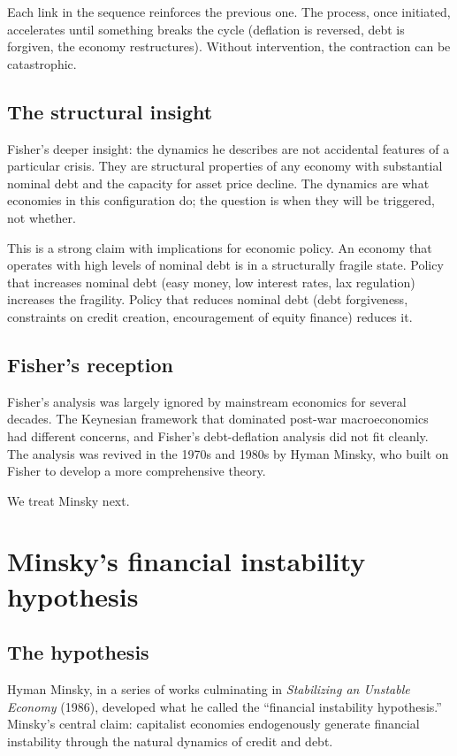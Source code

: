 Each link in the sequence reinforces the previous one. The
process, once initiated, accelerates until something breaks the
cycle (deflation is reversed, debt is forgiven, the economy
restructures). Without intervention, the contraction can be
catastrophic.

\subsection{The structural insight}

Fisher's deeper insight: the dynamics he describes are not
accidental features of a particular crisis. They are structural
properties of any economy with substantial nominal debt and the
capacity for asset price decline. The dynamics are what economies
in this configuration do; the question is when they will be
triggered, not whether.

This is a strong claim with implications for economic policy. An
economy that operates with high levels of nominal debt is in a
structurally fragile state. Policy that increases nominal debt
(easy money, low interest rates, lax regulation) increases the
fragility. Policy that reduces nominal debt (debt forgiveness,
constraints on credit creation, encouragement of equity finance)
reduces it.

\subsection{Fisher's reception}

Fisher's analysis was largely ignored by mainstream economics for
several decades. The Keynesian framework that dominated post-war
macroeconomics had different concerns, and Fisher's
debt-deflation analysis did not fit cleanly. The analysis was
revived in the 1970s and 1980s by Hyman Minsky, who built on
Fisher to develop a more comprehensive theory.

We treat Minsky next.

\section{Minsky's financial instability hypothesis}
\label{sec:riba-minsky}

\subsection{The hypothesis}

Hyman Minsky, in a series of works culminating in
\emph{Stabilizing an Unstable Economy} (1986), developed what he
called the ``financial instability hypothesis.'' Minsky's central
claim: capitalist economies endogenously generate financial
instability through the natural dynamics of credit and debt.


